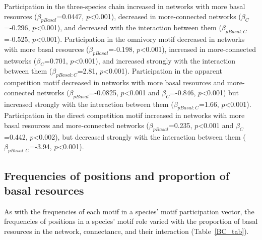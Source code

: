 \documentclass[12pt]{article}
\begin{document}
\begin{spacing}{2.0}
        Participation in the three-species chain increased in networks with more basal resources ($\beta_{pBasal}$=0.0447, $p$\textless0.001), decreased in more-connected networks ($\beta_C$=-0.296, $p$\textless0.001), and decreased with the interaction between them ($\beta_{pBasal:C}$=-0.525, $p$\textless0.001).
        Participation in the omnivory motif decreased in networks with more basal resources ($\beta_{pBasal}$=-0.198, $p$\textless0.001), increased in more-connected networks ($\beta_C$=0.701, $p$\textless0.001), and increased strongly with the interaction between them ($\beta_{pBasal:C}$=2.81, $p$\textless0.001).
        Participation in the apparent competition motif decreased in networks with more basal resources and more-connected networks ($\beta_{pBasal}$=-0.0825, $p$\textless0.001 and $\beta_C$=-0.846, $p$\textless0.001) but increased strongly with the interaction between them ($\beta_{pBasal:C}$=1.66, $p$\textless0.001).
        Participation in the direct competition motif increased in networks with more basal resources and more-connected networks ($\beta_{pBasal}$=0.235, $p$\textless0.001 and $\beta_C$=0.442, $p$\textless0.002), but decreased strongly with the interaction between them ($\beta_{pBasal:C}$=-3.94, $p$\textless0.001).
        
    
    \subsection*{Frequencies of positions and proportion of basal resources}

        As with the frequencies of each motif in a species' motif participation vector, the frequencies of positions in a species' motif role varied with the proportion of basal resources in the network, connectance, and their interaction (Table~\ref{BC_tab}).
        


\end{spacing}
\end{document}
